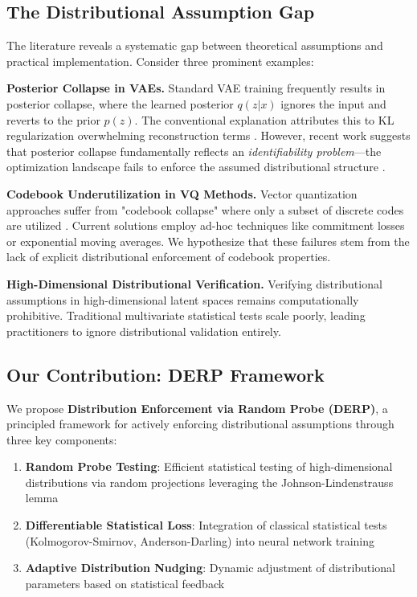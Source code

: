 \documentclass{article}
\begin{document}
\subsection{The Distributional Assumption Gap}

The literature reveals a systematic gap between theoretical assumptions and practical implementation. Consider three prominent examples:

\textbf{Posterior Collapse in VAEs.} Standard VAE training frequently results in posterior collapse, where the learned posterior $q(z|x)$ ignores the input and reverts to the prior $p(z)$. The conventional explanation attributes this to KL regularization overwhelming reconstruction terms \citep{bowman2015generating}. However, recent work suggests that posterior collapse fundamentally reflects an \emph{identifiability problem}—the optimization landscape fails to enforce the assumed distributional structure \citep{lucas2019don, wang2023posterior}.

\textbf{Codebook Underutilization in VQ Methods.} Vector quantization approaches suffer from "codebook collapse" where only a subset of discrete codes are utilized \citep{van2017neural}. Current solutions employ ad-hoc techniques like commitment losses or exponential moving averages. We hypothesize that these failures stem from the lack of explicit distributional enforcement of codebook properties.

\textbf{High-Dimensional Distributional Verification.} Verifying distributional assumptions in high-dimensional latent spaces remains computationally prohibitive. Traditional multivariate statistical tests scale poorly, leading practitioners to ignore distributional validation entirely.

\subsection{Our Contribution: DERP Framework}

We propose \textbf{Distribution Enforcement via Random Probe (DERP)}, a principled framework for actively enforcing distributional assumptions through three key components:

\begin{enumerate}
\item \textbf{Random Probe Testing}: Efficient statistical testing of high-dimensional distributions via random projections leveraging the Johnson-Lindenstrauss lemma
\item \textbf{Differentiable Statistical Loss}: Integration of classical statistical tests (Kolmogorov-Smirnov, Anderson-Darling) into neural network training
\item \textbf{Adaptive Distribution Nudging}: Dynamic adjustment of distributional parameters based on statistical feedback
\end{enumerate}
\end{document}
